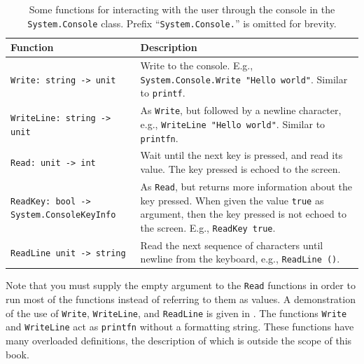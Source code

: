\documentclass[fsharpNotes.tex]{subfiles}
\begin{document}
%
\begin{table}
  \begin{center}
    \begin{tabularx}{\linewidth}{|l|Y|}
      \hline
       Function & Description\\
      \hline
      \lstinline{Write: string -> unit} & Write to the console. E.g., \mbox{\lstinline!System.Console.Write "Hello world"!}. Similar to \lstinline{printf}.\\
      \hline
      \lstinline{WriteLine: string -> unit} & As \lstinline!Write!, but followed by a newline character, e.g., \mbox{\lstinline!WriteLine "Hello world"!}. Similar to \lstinline{printfn}.\\
      \hline
      \lstinline{Read: unit -> int} & Wait until the next key is pressed, and read its value. The key pressed is echoed to the screen.\\
      \hline
      \lstinline{ReadKey: bool -> System.ConsoleKeyInfo} & As \lstinline!Read!, but returns more information about the key pressed. When given the value \lstinline{true} as argument, then the key pressed is not echoed to the screen. E.g., \mbox{\lstinline!ReadKey true!}.\\
      \hline
      \lstinline{ReadLine unit -> string} & Read the next sequence of characters until newline from the keyboard, e.g., \mbox{\lstinline!ReadLine ()!}.\\
      \hline
    \end{tabularx}
  \end{center}
  \caption{Some functions for interacting with the user through the console in the \lstinline{System.Console} class. Prefix ``\lstinline{System.Console.}'' is omitted for brevity.}
  \label{tab:readWrite}
\end{table}
Note that you must supply the empty argument \lexeme{()} to the \lstinline!Read! functions in order to run most of the functions instead of referring to them as values. A demonstration of the use of \lstinline{Write}, \lstinline{WriteLine},  and \lstinline{ReadLine} is given in .
%
%
The functions \lstinline!Write! and \lstinline!WriteLine! act as \lstinline!printfn! without a formatting string. These functions have many overloaded definitions, the description of which is outside the scope of this book. 
\end{document}
